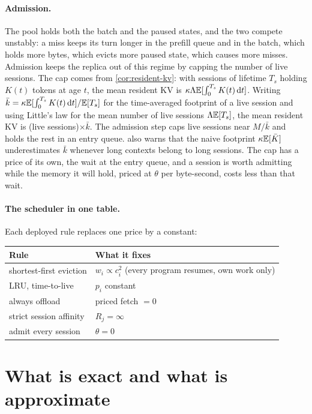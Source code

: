 \paragraph{Admission.} The pool holds both the batch and the paused
states, and the two compete unstably: a miss keeps its turn longer in the
prefill queue and in the batch, which holds more bytes, which evicts more
paused state, which causes more misses. Admission keeps the replica out
of this regime by capping the number of live sessions. The cap comes from
\cref{cor:resident-kv}: with sessions of lifetime $T_s$ holding $K(t)$
tokens at age $t$, the mean resident KV is $\kappa\Lambda\mathbb{E}[\int_0^{T_s}K(t)\,\mathrm{d} t]$.
Writing $\bar k=\kappa\mathbb{E}[\int_0^{T_s}K(t)\,\mathrm{d} t]/\mathbb{E}[T_s]$ for the
time-averaged footprint of a live session and using Little's law for the
mean number of live sessions $\Lambda\mathbb{E}[T_s]$, the mean resident KV is
(live sessions)$\times\bar k$. The admission step caps live sessions near
$M/\bar k$ and holds the rest in an entry queue. 
also warns that the naive footprint $\kappa\mathbb{E}[\bar K]$ underestimates
$\bar k$ whenever long contexts belong to long sessions. The cap has a price
of its own, the wait at the entry queue, and a session is worth admitting
while the memory it will hold, priced at $\theta$ per byte-second, costs
less than that wait.

\paragraph{The scheduler in one table.} Each deployed rule replaces one
price by a constant:
\begin{center}\small
\begin{tabular}{@{}ll@{}}
\toprule
Rule & What it fixes \\
\midrule
shortest-first eviction & $w_i\propto c_i^2$ (every program resumes, own work only) \\
LRU, time-to-live & $p_i$ constant \\
always offload & priced fetch $=0$ \\
strict session affinity & $R_j=\infty$ \\
admit every session & $\theta=0$ \\
\bottomrule
\end{tabular}
\end{center}

\section{What is exact and what is approximate}\label{L5:sec:honest}

